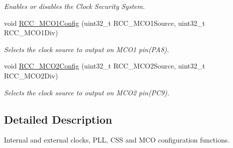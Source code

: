 \begin{DoxyCompactItemize}
\begin{DoxyCompactList}\small\item\em Enables or disables the Clock Security System. \end{DoxyCompactList}\item 
void \mbox{\hyperlink{group___r_c_c___group1_ga15c9ecb6ef015ed008cb28e5b7a50531}{R\+C\+C\+\_\+\+M\+C\+O1\+Config}} (uint32\+\_\+t R\+C\+C\+\_\+\+M\+C\+O1\+Source, uint32\+\_\+t R\+C\+C\+\_\+\+M\+C\+O1\+Div)
\begin{DoxyCompactList}\small\item\em Selects the clock source to output on M\+C\+O1 pin(\+P\+A8). \end{DoxyCompactList}\item 
void \mbox{\hyperlink{group___r_c_c___group1_gaf50f10675b747de60c739e44e5c22aee}{R\+C\+C\+\_\+\+M\+C\+O2\+Config}} (uint32\+\_\+t R\+C\+C\+\_\+\+M\+C\+O2\+Source, uint32\+\_\+t R\+C\+C\+\_\+\+M\+C\+O2\+Div)
\begin{DoxyCompactList}\small\item\em Selects the clock source to output on M\+C\+O2 pin(\+P\+C9). \end{DoxyCompactList}\end{DoxyCompactItemize}


\subsection{Detailed Description}
Internal and external clocks, P\+LL, C\+SS and M\+CO configuration functions. 

